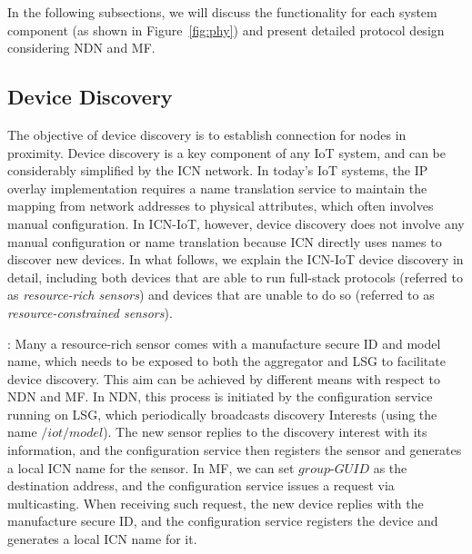 In the following subsections, we will discuss the functionality for each system component (as shown in Figure~\ref{fig:phy}) and present detailed protocol design considering NDN and MF.

\subsection{Device Discovery}
The objective of device discovery is to establish connection for nodes in proximity. Device discovery is a key component of any IoT system, and can be considerably simplified by the ICN network. In today's IoT systems, the IP overlay implementation requires a name translation service to maintain the mapping from network addresses to physical attributes, which often involves manual configuration. In ICN-IoT, however, device discovery does not involve any manual configuration or name translation because ICN directly uses names to discover new devices. In what follows, we explain the ICN-IoT device discovery  in detail, including both devices that are able to run  full-stack protocols (referred to as \emph{resource-rich sensors}) and devices that are unable to do so (referred to as \emph{resource-constrained sensors}).

\vspace{1mm}: Many a resource-rich sensor comes with a manufacture secure ID and model name, which needs to be exposed to both the aggregator and LSG to facilitate device discovery. This aim can be achieved by different means with respect to NDN and MF.  In NDN, this process is initiated by the configuration service running on LSG, which periodically broadcasts discovery Interests (using the name $/iot/model$). The new sensor replies to the discovery interest with its information, and the configuration service then registers the sensor and generates a local ICN name for the sensor. In MF, we can set $group$-$GUID$ as the destination address, and the configuration service issues a request via multicasting. When receiving such request, the new device replies with the manufacture secure ID, and the configuration service registers the device and  generates a local ICN name for it.


